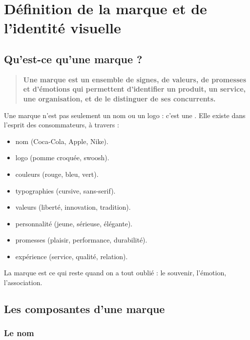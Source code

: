 \section{Définition de la marque et de l'identité visuelle}

\subsection{Qu'est-ce qu'une marque ?}

\begin{quote}
\textbf{Une marque est un ensemble de signes, de valeurs, de promesses et d'émotions qui permettent d'identifier un produit, un service, une organisation, et de le distinguer de ses concurrents.}
\end{quote}

Une marque n'est pas seulement un nom ou un logo : c'est une . Elle existe dans l'esprit des consommateurs, à travers :

\begin{itemize}
    \item {} nom (Coca-Cola, Apple, Nike).
    \item {} logo (pomme croquée, swoosh).
    \item {} couleurs (rouge, bleu, vert).
    \item {} typographies (cursive, sans-serif).
    \item {} valeurs (liberté, innovation, tradition).
    \item {} personnalité (jeune, sérieuse, élégante).
    \item {} promesses (plaisir, performance, durabilité).
    \item {} expérience (service, qualité, relation).
\end{itemize}

La marque est ce qui reste quand on a tout oublié : le souvenir, l'émotion, l'association.

\subsection{Les composantes d'une marque}

\subsubsection{Le nom}

